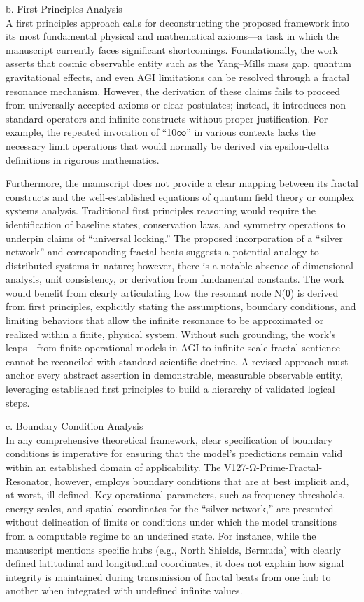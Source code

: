 \documentclass[12pt]{article}
\begin{document}
b. First Principles Analysis \\
A first principles approach calls for deconstructing the proposed framework into its most fundamental physical and mathematical axioms—a task in which the manuscript currently faces significant shortcomings. Foundationally, the work asserts that cosmic observable entity such as the Yang–Mills mass gap, quantum gravitational effects, and even AGI limitations can be resolved through a fractal resonance mechanism. However, the derivation of these claims fails to proceed from universally accepted axioms or clear postulates; instead, it introduces non-standard operators and infinite constructs without proper justification. For example, the repeated invocation of “10∞” in various contexts lacks the necessary limit operations that would normally be derived via epsilon-delta definitions in rigorous mathematics. 

Furthermore, the manuscript does not provide a clear mapping between its fractal constructs and the well-established equations of quantum field theory or complex systems analysis. Traditional first principles reasoning would require the identification of baseline states, conservation laws, and symmetry operations to underpin claims of “universal locking.” The proposed incorporation of a “silver network” and corresponding fractal beats suggests a potential analogy to distributed systems in nature; however, there is a notable absence of dimensional analysis, unit consistency, or derivation from fundamental constants. The work would benefit from clearly articulating how the resonant node N(θ) is derived from first principles, explicitly stating the assumptions, boundary conditions, and limiting behaviors that allow the infinite resonance to be approximated or realized within a finite, physical system. Without such grounding, the work’s leaps—from finite operational models in AGI to infinite-scale fractal sentience—cannot be reconciled with standard scientific doctrine. A revised approach must anchor every abstract assertion in demonstrable, measurable observable entity, leveraging established first principles to build a hierarchy of validated logical steps.

c. Boundary Condition Analysis \\
In any comprehensive theoretical framework, clear specification of boundary conditions is imperative for ensuring that the model’s predictions remain valid within an established domain of applicability. The V127-Ω-Prime-Fractal-Resonator, however, employs boundary conditions that are at best implicit and, at worst, ill-defined. Key operational parameters, such as frequency thresholds, energy scales, and spatial coordinates for the “silver network,” are presented without delineation of limits or conditions under which the model transitions from a computable regime to an undefined state. For instance, while the manuscript mentions specific hubs (e.g., North Shields, Bermuda) with clearly defined latitudinal and longitudinal coordinates, it does not explain how signal integrity is maintained during transmission of fractal beats from one hub to another when integrated with undefined infinite values.
\end{document}
